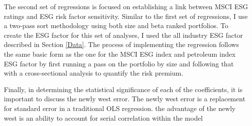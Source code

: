 The second set of regressions is focused on establishing a link between MSCI ESG ratings and ESG risk factor sensitivity. Similar to the first set of regressions, I use a two-pass sort methodology using both size and beta ranked portfolios. To create the ESG factor for this set of analyses, I used the all industry ESG factor described in Section \ref{Data}. The process of implementing the regression follows the same basic form as the one for the MSCI ESG index and petroleum index ESG factor by first running a pass on the portfolio by size and following that with a cross-sectional analysis to quantify the risk premium. 

Finally, in determining the statistical significance of each of the coefficients, it is important to discuss the newly west error. The newly west error is a replacement for standard error in a traditional OLS regression. the advantage of the newly west is an ability to account for serial correlation within the model 

